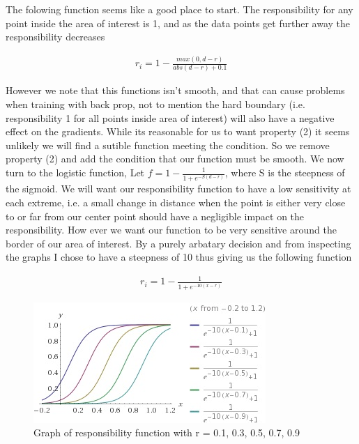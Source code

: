 \documentclass{article}
\begin{document}
The folowing function seems like a good place to start. The responsibility for any point inside the area of interest is 1, and as the data points get further away the responsibility decreases

\begin{align}
r_i = 1 - \frac{max(0, d-r)}{abs(d-r) + 0.1}
\end{align}

However we note that this functions isn't smooth, and that can cause problems when training with back prop, not to mention the hard boundary (i.e. responsibility 1 for all points inside area of interest) will also have a negative effect on the gradients. While its reasonable for us to want property (2) it seems unlikely we will find a sutible function meeting the condition. So we remove property (2) and add the condition that our function must be smooth. We now turn to the logistic function, Let $f = 1 - \frac{1}{1 + e^{-S(d - r)}}$, where S is the steepness of the sigmoid. We will want our responsibility function to have a low sensitivity at each extreme, i.e. a small change in distance when the point is either very close to or far from our center point should have a negligible impact on the responsibility. How ever we want our function to be very sensitive around the border of our area of interest. By a purely arbatary decision and from inspecting the graphs I chose to have a steepness of 10 thus giving us the following function

\begin{align}
r_i = 1 - \frac{1}{1 + e^{-10(x-r)}}
\end{align}

\begin{figure}[H]
\centering
  \begin{minipage}[b]{0.4\textwidth}
    \includegraphics[width=\textwidth]{Responsibility-Function.jpg}
    \caption{Graph of responsibility function with r = 0.1, 0.3, 0.5, 0.7, 0.9}
  \end{minipage}
  \hfill
\end{figure}
\end{document}

